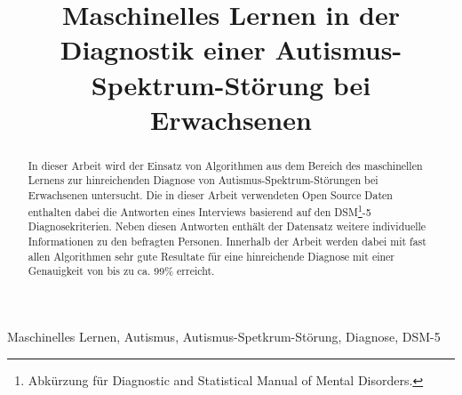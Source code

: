 \documentclass[conference]{IEEEtran}
\begin{document}
\title{Maschinelles Lernen in der Diagnostik einer Autismus-Spektrum-Störung bei Erwachsenen}

\author{
}

\maketitle

\begin{abstract}
In dieser Arbeit wird der Einsatz von Algorithmen aus dem Bereich des maschinellen Lernens zur hinreichenden Diagnose von Autismus-Spektrum-Störungen bei Erwachsenen untersucht. Die in dieser Arbeit verwendeten Open Source Daten enthalten dabei die Antworten eines Interviews basierend auf den DSM\footnote{\label{foot:1}Abkürzung für \glqq Diagnostic and Statistical Manual of Mental Disorders\grqq{}.}-5 Diagnosekriterien. Neben diesen Antworten enthält der Datensatz weitere individuelle Informationen zu den befragten Personen. Innerhalb der Arbeit werden dabei mit fast allen Algorithmen sehr gute Resultate für eine hinreichende Diagnose mit einer Genauigkeit von bis zu ca. 99\% erreicht.
\end{abstract}

\begin{IEEEkeywords}
Maschinelles Lernen, Autismus, Autismus-Spetkrum-Störung, Diagnose, DSM-5
\end{IEEEkeywords}











\printbibliography
\end{document}
